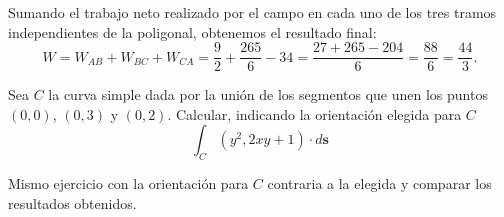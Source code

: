 \noindent Sumando el trabajo neto realizado por el campo en cada uno de los tres tramos independientes de la poligonal, obtenemos el resultado final: 
\[ 
W = W_{AB} + W_{BC} + W_{CA} = \frac{9}{2} + \frac{265}{6} - 34 = \frac{27 + 265 - 204}{6} = \frac{88}{6} = \frac{44}{3}. \tag*{$\blacksquare$} 
\] 




 \begin{tarea} Sea $C$ la curva simple dada por la uni\'on de los segmentos que unen los puntos $(0,0)$,  $(0,3)$ y $(0,2)$. Calcular, indicando la orientaci\'on elegida para $C$  $$ \int_{C}  (y^{2}, 2xy +1)  \cdot d\mathbf{s} $$
 \end{tarea}

 \begin{tarea} Mismo ejercicio con la orientaci\'on para $C$ contraria  a la elegida y comparar los resultados obtenidos. 
 \end{tarea}





